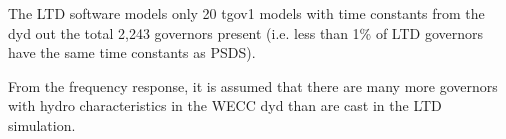 \documentclass[12pt]{article}
\begin{document}
The LTD software models only 20 tgov1 models with time constants from the dyd out the total 2,243 governors present (i.e. less than 1\% of LTD governors have the same time constants as PSDS).

From the frequency response, it is assumed that there are many more governors with hydro characteristics in the WECC dyd than are cast in the LTD simulation.
		
\end{document}
